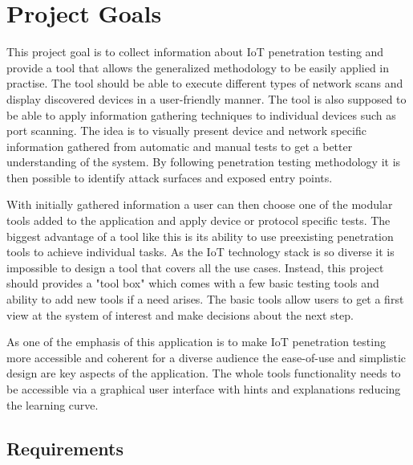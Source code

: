 \section{Project Goals}
This project goal is to collect information about IoT penetration testing and provide a tool that allows the generalized methodology to be easily applied in practise. The tool should be able to execute different types of network scans and display discovered devices in a user-friendly manner. The tool is also supposed to be able to apply information gathering techniques to individual devices such as port scanning. The idea is to visually present device and network specific information gathered from automatic and manual tests to get a better understanding of the system. By following penetration testing methodology it is then possible to identify attack surfaces and exposed entry points.

With initially gathered information a user can then choose one of the modular tools added to the application and apply device or protocol specific tests. The biggest advantage of a tool like this is its ability to use preexisting penetration tools to achieve individual tasks. As the IoT technology stack is so diverse it is impossible to design a tool that covers all the use cases. Instead, this project should provides a "tool box" which comes with a few basic testing tools and ability to add new tools if a need arises. The basic tools allow users to get a first view at the system of interest and make decisions about the next step.

As one of the emphasis of this application is to make IoT penetration testing more accessible and coherent for a diverse audience the ease-of-use and simplistic design are key aspects of the application. The whole tools functionality needs to be accessible via a graphical user interface with hints and explanations reducing the learning curve.

\subsection{Requirements}
